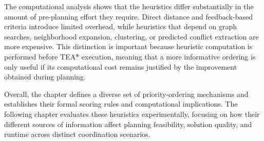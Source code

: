 The computational analysis shows that the heuristics differ substantially in the amount of
pre-planning effort they require. Direct distance and feedback-based criteria introduce limited
overhead, while heuristics that depend on graph searches, neighborhood expansion, clustering, or
predicted conflict extraction are more expensive. This distinction is important because heuristic
computation is performed before TEA* execution, meaning that a more informative ordering is only
useful if its computational cost remains justified by the improvement obtained during planning.

Overall, the chapter defines a diverse set of priority-ordering mechanisms and establishes their
formal scoring rules and computational implications. The following chapter evaluates these
heuristics experimentally, focusing on how their different sources of information affect planning
feasibility, solution quality, and runtime across distinct coordination scenarios.


